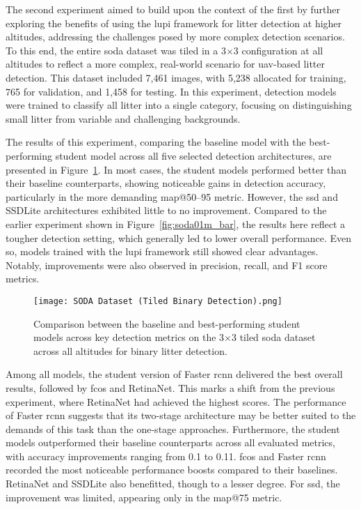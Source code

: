 The second experiment aimed to build upon the context of the first by further exploring the benefits of using the \gls{lupi} framework for litter detection at higher altitudes, addressing the challenges posed by more complex detection scenarios. To this end, the entire \gls{soda} dataset was tiled in a 3$\times$3 configuration at all altitudes to reflect a more complex, real-world scenario for \gls{uav}-based litter detection. This dataset included 7,461 images, with 5,238 allocated for training, 765 for validation, and 1,458 for testing. In this experiment, detection models were trained to classify all litter into a single category, focusing on distinguishing small litter from variable and challenging backgrounds.

The results of this experiment, comparing the baseline model with the best-performing student model across all five selected detection architectures, are presented in Figure~\ref{fig:soda_tiled_single_bar}. In most cases, the student models performed better than their baseline counterparts, showing noticeable gains in detection accuracy, particularly in the more demanding \gls{map}@50–95 metric. However, the \gls{ssd} and SSDLite architectures exhibited little to no improvement.
Compared to the earlier experiment shown in Figure~\ref{fig:soda01m_bar}, the results here reflect a tougher detection setting, which generally led to lower overall performance. Even so, models trained with the \gls{lupi} framework still showed clear advantages. Notably, improvements were also observed in precision, recall, and F1 score metrics.

\begin{figure}[!ht]
    \centering
    \texttt{[image: SODA Dataset (Tiled Binary Detection).png]}
    \caption{Comparison between the baseline and best-performing student models across key detection metrics on the 3$\times$3 tiled \gls{soda} dataset across all altitudes for binary litter detection.}
    \label{fig:soda_tiled_single_bar}
\end{figure}

Among all models, the student version of Faster \gls{rcnn} delivered the best overall results, followed by \gls{fcos} and RetinaNet. This marks a shift from the previous experiment, where RetinaNet had achieved the highest scores. The performance of Faster \gls{rcnn} suggests that its two-stage architecture may be better suited to the demands of this task than the one-stage approaches. Furthermore, the student models outperformed their baseline counterparts across all evaluated metrics, with accuracy improvements ranging from 0.1 to 0.11. \gls{fcos} and Faster \gls{rcnn} recorded the most noticeable performance boosts compared to their baselines. RetinaNet and SSDLite also benefitted, though to a lesser degree. For \gls{ssd}, the improvement was limited, appearing only in the \gls{map}@75 metric.

